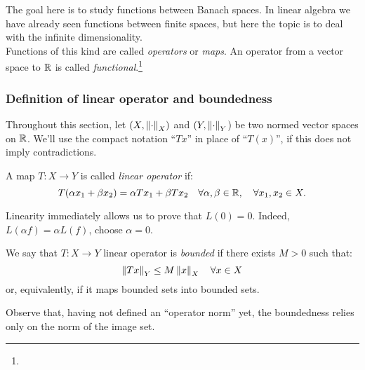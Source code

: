 The goal here is to study functions between Banach spaces. In linear algebra we have already seen functions between finite spaces, but here the topic is to deal with the infinite dimensionality. \\
Functions of this kind are called \emph{operators} or \emph{maps}. An operator from a vector space to $\mathbb R$ is called \emph{functional}.\footnote{}


\subsubsection{Definition of linear operator and boundedness}

Throughout this section, let $(X,\left\lVert\cdot\right\rVert_X)$ and $(Y,\left\lVert\cdot\right\rVert_Y$) be two normed vector spaces on $\mathbb R$. We'll use the compact notation ``$Tx$'' in place of ``$T(x)$'', if this does not imply contradictions.

\medskip
\begin{defn}
	A map $T:X \to Y$ is called \emph{linear operator} if:
	$$
		T(\alpha x_1 + \beta x_2) 
		= \alpha T x_1 + \beta T x_2 
		\quad \forall \alpha, \beta \in \mathbb R, 
		\quad \forall x_1, x_2 \in X
	.
	$$
\end{defn}

Linearity immediately allows us to prove that $L(0)=0$. Indeed, $L(\alpha f) = \alpha L(f)$, choose $\alpha = 0$.

\begin{defn}
	We say that $T:X\to Y$ linear operator is \emph{bounded} if there exists $M > 0$ such that:
	$$
		\left\lVert Tx\right\rVert_Y 
		\leq M\left\lVert x\right\rVert_X 
		\quad \forall x \in X
	$$
	or, equivalently, if it maps bounded sets into bounded sets.
\end{defn}
Observe that, having not defined an ``operator norm'' yet, the boundedness relies only on the norm of the image set.


